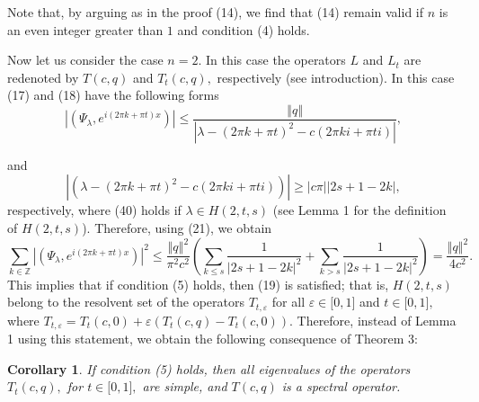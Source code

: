 \documentclass{article}%
\newtheorem{corollary}{Corollary}
\begin{document}
Note that, by arguing as in the proof (14), we find that (14) remain valid if
$n$ is an even integer greater than $1$ and condition (4) holds.

Now let us consider the case $n=2.$ In this case the operators $L$ and $L_{t}$
are redenoted by $T(c,q)$ and $T_{t}(c,q),$ respectively (see introduction).
In this case (17) and (18) have the following forms
\begin{equation}
\left\vert \left(  \Psi_{\lambda},e^{i\left(  2\pi k+\pi t\right)  x}\right)
\right\vert \leq\frac{\left\Vert q\right\Vert }{\left\vert \lambda-\left(
2\pi k+\pi t\right)  ^{2}-c(2\pi ki+\pi ti)\right\vert }, \tag{39}%
\end{equation}


and
\begin{equation}
\left\vert \left(  \lambda-\left(  2\pi k+\pi t\right)  ^{2}-c(2\pi ki+\pi
ti)\right)  \right\vert \geq\left\vert c\pi\right\vert \left\vert
2s+1-2k\right\vert , \tag{40}%
\end{equation}
respectively, where (40) holds if $\lambda\in H(2,t,s)$ (see Lemma 1 for the
definition of $H(2,t,s)$). Therefore, using (21), we obtain
\[
\sum_{k\in\mathbb{Z}}\left\vert \left(  \Psi_{\lambda},e^{i\left(  2\pi k+\pi
t\right)  x}\right)  \right\vert ^{2}\leq\frac{\left\Vert q\right\Vert ^{2}%
}{\pi^{2}c^{2}}\left(  \sum_{k\leq s}\frac{1}{\left\vert 2s+1-2k\right\vert
^{2}}+\sum_{k>s}\frac{1}{\left\vert 2s+1-2k\right\vert ^{2}}\right)
=\frac{\left\Vert q\right\Vert ^{2}}{4c^{2}}.
\]
This implies that if condition (5) holds, then (19) is satisfied; that is,
$H(2,t,s)$ belong to the resolvent set of the operators $T_{t,\varepsilon}$
for all $\varepsilon\in\lbrack0,1]$ and $t\in\lbrack0,1],$ where
$T_{t,\varepsilon}=T_{t}(c,0)+\varepsilon(T_{t}(c,q)-T_{t}(c,0))$. Therefore,
instead of Lemma 1 using this statement, we obtain the following consequence
of Theorem 3:

\begin{corollary}
If condition (5) holds, then all eigenvalues of the operators $T_{t}(c,q),$
for $t\in\lbrack0,1],$ are simple, and $T(c,q)$ is a spectral operator.
\end{corollary}
\end{document}
